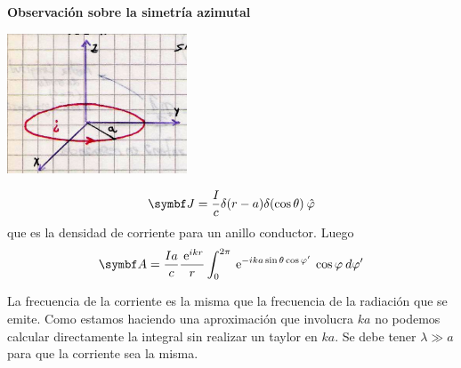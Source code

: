 \documentclass[10pt,oneside]{CBFT_book}
\begin{document}
\begin{ejemplo}{\bf Observación sobre la simetría azimutal}

\includegraphics[width=0.4\textwidth]{images/fig_ft1_antena_sime_azimu.jpg}

\[
	\vb J = \frac{I}{c} \delta(r-a)\delta(\cos\theta) \phiver 
\]
que es la densidad de corriente para un anillo conductor. Luego
\[
	\vb A = \frac{Ia}{c} \frac{\euler^{ikr}}{r} \int_0^{2\pi}
	\euler^{ - i k a \sin\theta \cos\vp' } \: \cos\vp \: d\vp'
\]

La frecuencia de la corriente es la misma que la frecuencia de la radiación que se emite.
Como estamos haciendo una aproximación que involucra $ka$ no podemos calcular directamente
la integral sin realizar un taylor en $ka$.
Se debe tener $\lambda \gg a$ para que la corriente sea la misma.
 
\end{ejemplo}
\end{document}

